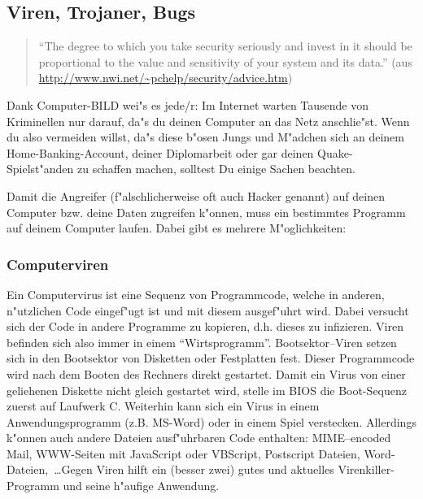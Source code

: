 
\subsection{Viren, Trojaner, Bugs}
\label{viren}

\begin{quote}
"`The degree to which you take security seriously and invest
in it should be proportional to the value and sensitivity of
your system and its data."' (aus \url{http://www.nwi.net/~pchelp/security/advice.htm})
\end{quote}

Dank Computer-BILD wei"s es jede/r: Im Internet warten Tausende 
von Kriminellen nur darauf, da"s du deinen Computer an das Netz anschlie"st.
Wenn du also vermeiden willst, da"s diese b"osen Jungs und M"adchen sich an 
deinem Home-Banking-Account, deiner Diplomarbeit oder gar deinen 
Quake-Spielst"anden zu schaffen machen, solltest Du einige Sachen beachten. 

Damit die Angreifer (f"alschlicherweise oft auch Hacker genannt) auf deinen
Computer bzw. deine Daten zugreifen k"onnen, muss ein bestimmtes Programm auf 
deinem Computer laufen. Dabei gibt es mehrere M"oglichkeiten:

\subsubsection{Computerviren}
Ein Computervirus ist eine Sequenz von Programmcode, welche 
in anderen, n"utzlichen Code eingef"ugt ist und mit diesem ausgef"uhrt wird. 
Dabei versucht sich der Code in andere Programme zu kopieren, d.h. dieses zu 
infizieren. Viren befinden sich also immer in einem "`Wirtsprogramm"'. 
Bootsektor--Viren setzen sich in den Bootsektor von Disketten oder Festplatten
fest. Dieser Programmcode wird nach dem Booten des Rechners direkt gestartet.
Damit ein Virus von einer geliehenen Diskette nicht gleich gestartet
wird, stelle im BIOS die Boot-Sequenz zuerst auf Laufwerk C.
Weiterhin kann sich ein Virus in einem Anwendungsprogramm (z.B. MS-Word) oder
in einem Spiel verstecken. Allerdings k"onnen auch andere Dateien ausf"uhrbaren
Code enthalten: MIME--encoded Mail, WWW-Seiten mit JavaScript oder VBScript,
Postscript Dateien, Word-Dateien,~\dots Gegen Viren hilft ein (besser zwei) gutes
und aktuelles Virenkiller-Programm und seine h"aufige Anwendung.

